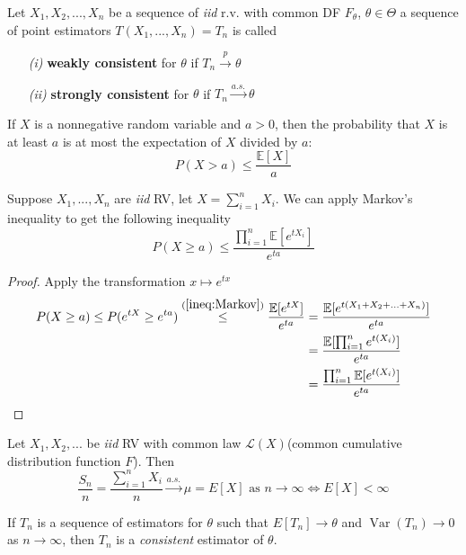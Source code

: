 \documentclass{tufte-handout}
\DeclareMathOperator{\var}{Var}
\begin{document}
\begin{definition}[Consistency]
  Let $X_1, X_2,..., X_n$ be a sequence of \textit{iid} r.v. with common DF $F_\theta $, $\theta \in \Theta$ a sequence of point estimators $T(X_1,...,X_n) = T_n$ is called
\begin{enumerate}
  \item[\it (i)]\textbf{weakly consistent} for $\theta$ if $T_n \overset{p}{\to} \theta $
  \item[\it (ii)]\textbf{strongly consistent} for $\theta$ if $T_n \overset{a.s.}{\to} \theta $ 
\end{enumerate}
  
\end{definition}
\begin{theorem}\label{ineq:Markov}
  If $X$ is a nonnegative random variable and $a > 0$, then the probability that $X$ is at least $a$ is at most the expectation of $X$ divided by $a$:
  $$P(X > a) \leq \frac{\mathbb{E}[X]}{a} $$
\end{theorem}
\begin{proposition} \label{ineq:Chernoff}
  Suppose $X_1,...,X_n$ are \textit{iid} RV, let $X = \sum^{n}_{i=1} X_i$. We can apply Markov’s inequality to get the following inequality 
  $$P(X \geq a) \leq \frac{\prod^{n}_{i=1} \mathbb{E}[e^{tX_i}]}{e^{ta}} $$
  \begin{proof} Apply the transformation $x \mapsto e^{tx}$
  \begin{equation*}
    \begin{split}
      P(X \geq a) \leq P(e^{tX} \geq e^{ta})\overset{(\ref{ineq:Markov})}{\leq} \frac{\mathbb{E}[e^{tX}]}{e^{ta}} &= \frac{\mathbb{E}[e^{t(X_1 + X_2 + ... + X_n)}]}{e^{ta}}  \\ 
      &= \frac{\mathbb{E}[\prod^{n}_{i=1} e^{t(X_i)}]}{e^{ta}} \\ 
      &= \frac{\prod^{n}_{i=1} \mathbb{E}[e^{t(X_i)}]}{e^{ta}} 
    \end{split}
  \end{equation*}
 \end{proof} 
\end{proposition}
\begin{definition}[Martingales]
  
\end{definition}
\begin{theorem} \label{label}
  Let $X_1,X_2, . . .$ be \textit{iid} RV with common law $\mathcal{L}(X)$(common
cumulative distribution function $F$). Then
  $$\frac{S_n}{n} = \frac{\sum^{n}_{i=1} X_i}{n} \overset{a.s.}{\to} \mu = E[X] \text{ as }n\to \infty \iff E[X] < \infty $$
\end{theorem}
\begin{theorem} \label{label}
  If $T_n$ is a sequence of estimators for $\theta$ such that $E [T_n]\to \theta$ and $\var (T_n) \to 0$ as $n \to \infty$, then $T_n$ is a \textit{consistent} estimator of $\theta.$  
\end{theorem}
\end{document}
